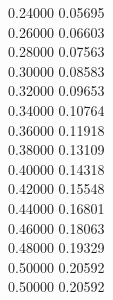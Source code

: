 \documentclass[a4paper,12pt,twoside]{report}
\numberwithin{equation}{chapter}
\begin{document}
\begin{texttt}
   0.24000\hspace{1cm}    0.05695 \\
   0.26000\hspace{1cm}    0.06603 \\
   0.28000\hspace{1cm}    0.07563 \\
   0.30000\hspace{1cm}    0.08583 \\
   0.32000\hspace{1cm}    0.09653 \\
   0.34000\hspace{1cm}    0.10764 \\
   0.36000\hspace{1cm}    0.11918 \\
   0.38000\hspace{1cm}    0.13109 \\
   0.40000\hspace{1cm}    0.14318 \\
   0.42000\hspace{1cm}    0.15548 \\
   0.44000\hspace{1cm}    0.16801 \\
   0.46000\hspace{1cm}    0.18063 \\
   0.48000\hspace{1cm}    0.19329 \\
   0.50000\hspace{1cm}    0.20592 \\
   0.50000\hspace{1cm}    0.20592 \\
\end{texttt}

\end{document}
